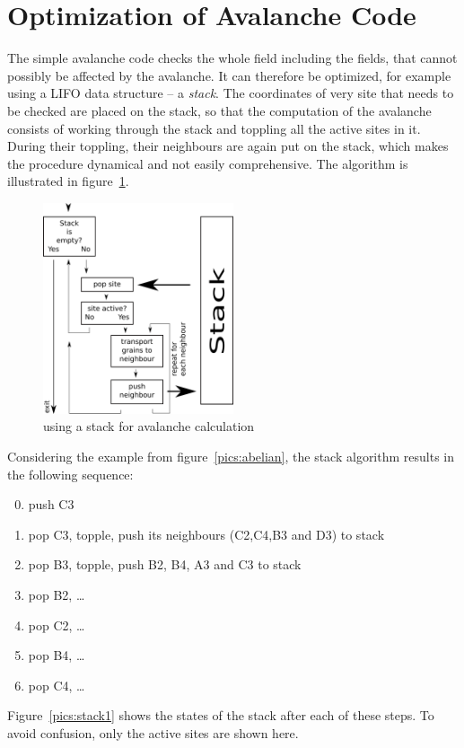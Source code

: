 \section{Optimization of Avalanche Code}
The simple avalanche code checks the whole field including the fields, that cannot possibly be affected by the avalanche. It can therefore be optimized, for example using a LIFO data structure -- a \emph{stack}. The coordinates of very site that needs to be checked are placed on the stack, so that the computation of the avalanche consists of working through the stack and toppling all the active sites in it. During their toppling, their neighbours are again put on the stack, which makes the procedure dynamical and not easily comprehensive. The algorithm is illustrated in figure~\ref{pics:stack2}.

\begin{figure}[!htpb]
\centering
\includegraphics[width=0.5\textwidth]{pics/pic3_stack2.pdf}
\caption[]{using a stack for avalanche calculation}
\label{pics:stack2}
\end{figure}

Considering the example from figure~\ref{pics:abelian}, the stack algorithm results in the following sequence:
\begin{enumerate}
 \setcounter{enumi}{-1}
 \item push C3
 \item pop C3, topple, push its neighbours (C2,C4,B3 and D3) to stack
 \item pop B3, topple, push B2, B4, A3 and C3 to stack
 \item pop B2, \ldots
 \item pop C2, \ldots
 \item pop B4, \ldots
 \item pop C4, \ldots
\end{enumerate}
Figure~\ref{pics:stack1} shows the states of the stack after each of these steps. To avoid confusion, only the active sites are shown here.

